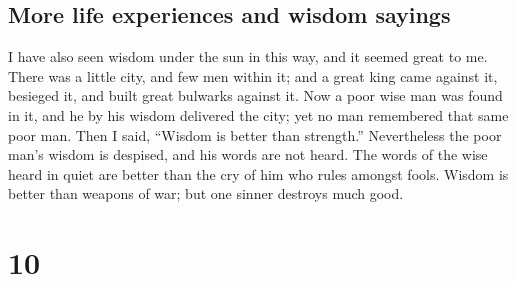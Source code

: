 \hypertarget{more-life-experiences-and-wisdom-sayings}{%
\subsection{More life experiences and wisdom
sayings}\label{more-life-experiences-and-wisdom-sayings}}

 I have also seen wisdom under the sun in this way, and
it seemed great to me.  There was a little city, and few
men within it; and a great king came against it, besieged it, and built
great bulwarks against it.  Now a poor wise man was found
in it, and he by his wisdom delivered the city; yet no man remembered
that same poor man.  Then I said, ``Wisdom is better than
strength.'' Nevertheless the poor man's wisdom is despised, and his
words are not heard.  The words of the wise heard in
quiet are better than the cry of him who rules amongst fools.
 Wisdom is better than weapons of war; but one sinner
destroys much good.

\hypertarget{section-9}{%
\section{10}\label{section-9}}


